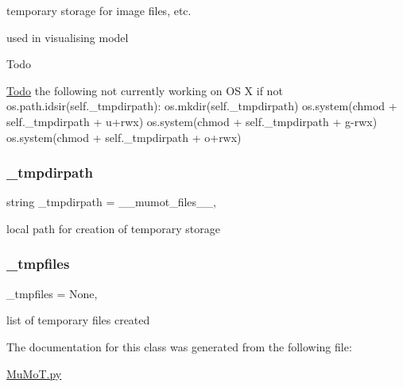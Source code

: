 temporary storage for image files, etc. 

used in visualising model

\begin{DoxyRefDesc}{Todo}
\item[\hyperlink{todo__todo000016}{Todo}]the following not currently working on OS X if not os.\+path.\+idsir(self.\+\_\+tmpdirpath)\+: os.\+mkdir(self.\+\_\+tmpdirpath) os.\+system(\textquotesingle{}chmod\textquotesingle{} + self.\+\_\+tmpdirpath + \textquotesingle{}u+rwx\textquotesingle{}) os.\+system(\textquotesingle{}chmod\textquotesingle{} + self.\+\_\+tmpdirpath + \textquotesingle{}g-\/rwx\textquotesingle{}) os.\+system(\textquotesingle{}chmod\textquotesingle{} + self.\+\_\+tmpdirpath + \textquotesingle{}o+rwx\textquotesingle{}) \end{DoxyRefDesc}
\mbox{\label{class_mu_mo_t_1_1_mu_mo_tmodel_a4ac4f3325e967c92d03e2c4e023a0d5d}} 
\subsubsection{\texorpdfstring{\+\_\+tmpdirpath}{\_tmpdirpath}}
{\footnotesize\ttfamily string \+\_\+tmpdirpath = \textquotesingle{}\+\_\+\+\_\+mumot\+\_\+files\+\_\+\+\_\+\textquotesingle{}\hspace{0.3cm}{\ttfamily [static]}, {\ttfamily [private]}}



local path for creation of temporary storage 

\mbox{\label{class_mu_mo_t_1_1_mu_mo_tmodel_a3f2d20ce626e9e6cdc4a4662727121e6}} 
\subsubsection{\texorpdfstring{\+\_\+tmpfiles}{\_tmpfiles}}
{\footnotesize\ttfamily \+\_\+tmpfiles = None\hspace{0.3cm}{\ttfamily [static]}, {\ttfamily [private]}}



list of temporary files created 



The documentation for this class was generated from the following file\+:\begin{DoxyCompactItemize}
\item 
\hyperlink{_mu_mo_t_8py}{Mu\+Mo\+T.\+py}\end{DoxyCompactItemize}

